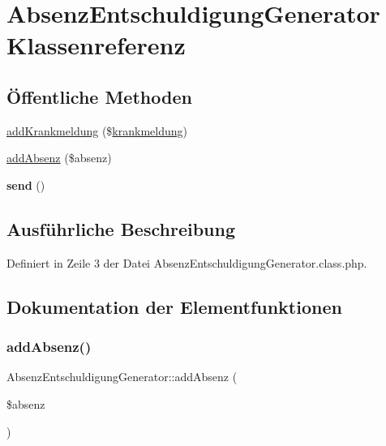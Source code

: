 \hypertarget{class_absenz_entschuldigung_generator}{}\section{Absenz\+Entschuldigung\+Generator Klassenreferenz}
\label{class_absenz_entschuldigung_generator}
\subsection*{Öffentliche Methoden}
\begin{DoxyCompactItemize}
\item 
\mbox{\hyperlink{class_absenz_entschuldigung_generator_a2d41f76e87c23924c853fb521a6f3369}{add\+Krankmeldung}} (\$\mbox{\hyperlink{classkrankmeldung}{krankmeldung}})
\item 
\mbox{\hyperlink{class_absenz_entschuldigung_generator_a46b872a4d03e7fe9f806432d00af5231}{add\+Absenz}} (\$absenz)
\item 
\mbox{\label{class_absenz_entschuldigung_generator_a62d2148a22f7145b4f0e6b4722502c06}} 
{\bfseries send} ()
\end{DoxyCompactItemize}


\subsection{Ausführliche Beschreibung}


Definiert in Zeile 3 der Datei Absenz\+Entschuldigung\+Generator.\+class.\+php.



\subsection{Dokumentation der Elementfunktionen}
\mbox{\label{class_absenz_entschuldigung_generator_a46b872a4d03e7fe9f806432d00af5231}} 
\subsubsection{\texorpdfstring{add\+Absenz()}{addAbsenz()}}
{\footnotesize\ttfamily Absenz\+Entschuldigung\+Generator\+::add\+Absenz (\begin{DoxyParamCaption}\item[{}]{\$absenz }\end{DoxyParamCaption})}


